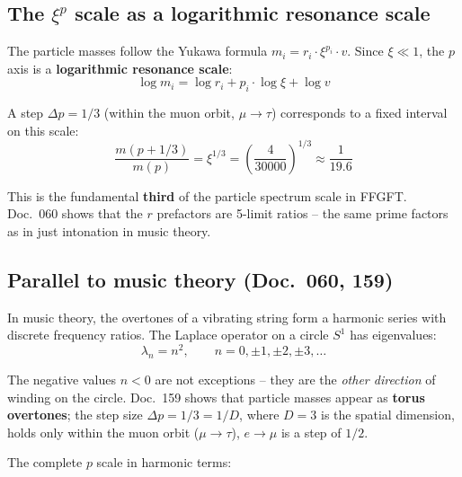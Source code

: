 \subsection{The \texorpdfstring{$\xi^p$}{xi\^{}p} scale as a logarithmic resonance scale}

The particle masses follow the Yukawa formula $m_i = r_i \cdot \xi^{p_i} \cdot v$.
Since $\xi \ll 1$, the $p$ axis is a \textbf{logarithmic resonance scale}:
\begin{equation}
    \log m_i = \log r_i + p_i \cdot \log \xi + \log v
\end{equation}

A step $\Delta p = 1/3$ (within the muon orbit, $\mu\to\tau$) corresponds to a fixed
interval on this scale:
\begin{equation}
    \frac{m(p + 1/3)}{m(p)} = \xi^{1/3}
    = \left(\frac{4}{30000}\right)^{1/3} \approx \frac{1}{19.6}
\end{equation}

This is the fundamental \textbf{third} of the particle spectrum scale in FFGFT.
Doc.~060 shows that the $r$ prefactors are 5-limit ratios -- the same prime
factors as in just intonation in music theory.

\subsection{Parallel to music theory (Doc.~060, 159)}

In music theory, the overtones of a vibrating string form a harmonic series
with discrete frequency ratios. The Laplace operator on a circle $S^1$
has eigenvalues:
\begin{equation}
    \lambda_n = n^2, \qquad n = 0, \pm 1, \pm 2, \pm 3, \ldots
\end{equation}

The negative values $n < 0$ are not exceptions -- they are the
\emph{other direction} of winding on the circle. Doc.~159 shows that
particle masses appear as \textbf{torus overtones}; the step size
$\Delta p = 1/3 = 1/D$, where $D = 3$ is the spatial dimension, holds only within the
muon orbit ($\mu\to\tau$), $e\to\mu$ is a step of $1/2$.

The complete $p$ scale in harmonic terms:

